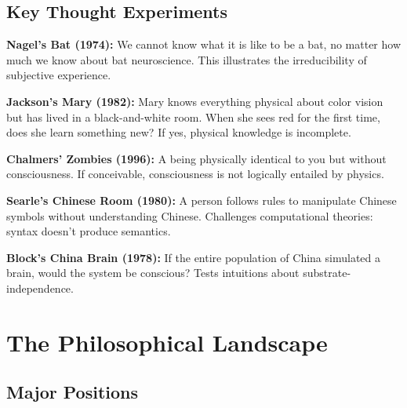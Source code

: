 \documentclass[11pt,a4paper]{report}
\begin{document}
\section{Key Thought Experiments}

\begin{histbox}
\textbf{Nagel's Bat (1974):} We cannot know what it is like to be a bat, no matter how much we know about bat neuroscience. This illustrates the irreducibility of subjective experience.

\textbf{Jackson's Mary (1982):} Mary knows everything physical about color vision but has lived in a black-and-white room. When she sees red for the first time, does she learn something new? If yes, physical knowledge is incomplete.

\textbf{Chalmers' Zombies (1996):} A being physically identical to you but without consciousness. If conceivable, consciousness is not logically entailed by physics.

\textbf{Searle's Chinese Room (1980):} A person follows rules to manipulate Chinese symbols without understanding Chinese. Challenges computational theories: syntax doesn't produce semantics.

\textbf{Block's China Brain (1978):} If the entire population of China simulated a brain, would the system be conscious? Tests intuitions about substrate-independence.
\end{histbox}


\chapter{The Philosophical Landscape}

\section{Major Positions}
\end{document}
